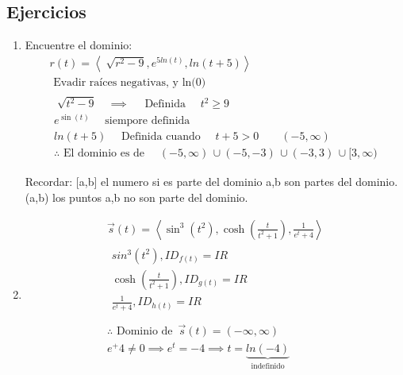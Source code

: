 \subsection{Ejercicios}
\begin{enumerate}
    \item Encuentre el dominio:
        \begin{align*}
            r(t) = \left\langle \sqrt[]{r^2-9}, e^{5ln(t)}, ln(t+5) \right\rangle \\ 
            \text{  Evadir raíces negativas, y ln(0)  } \\ 
            \begin{matrix}
                \sqrt[]{t^2-9} \quad \implies \quad \text{  Definida   } \quad t^2 \geq 9 \\ 
                e^{\sin(t)} \quad \text{  siempore definida  } \\ 
                ln(t+5) \quad \text{  Definida cuando   } \quad t +5 > 0 \quad \quad (-5, \infty ) \\ 
                \therefore \text{  El dominio es de   } \quad (-5,\infty ) \, \cup (-5,-3) \, \cup (-3,3) \, \cup [3,\infty ) \\ 
            \end{matrix} \\ 
        \end{align*}
        Recordar: [a,b] el numero si es parte del dominio a,b son partes del dominio. (a,b) los puntos a,b no son parte del dominio.
    
    \item \begin{align*}
        \vec{s}(t) = \left\langle \sin^3(t^2), \cosh(\frac{t}{t^2+1} ), \frac{1}{e^t+4}  \right\rangle \\ 
        \begin{matrix}
            sin^3(t^2), ID_{f(t)} = IR \\ 
            \cosh(\frac{t}{t^2+1} ), ID_{g(t)} = IR \\ 
            \frac{1}{e^t+4}, ID_{h(t)} = IR \\ 
        \end{matrix} \\ 
        \therefore \text{  Dominio de   } \, \vec{s}(t) = (-\infty ,\infty ) \\ 
        e^+4\neq 0 \implies e^t=-4 \implies t = \underbrace{ln(-4)}_{\text{  indefinido  }} \\ 
    \end{align*}
\end{enumerate}


